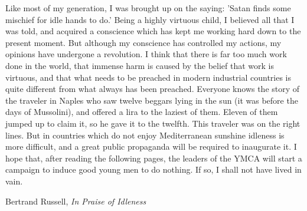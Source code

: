 \vspace*{2cm}
\epigraph{Like most of my generation, I was brought up on the saying: 'Satan finds some mischief for idle hands to do.' Being a highly virtuous child, I believed all that I was told, and acquired a conscience which has kept me working hard down to the present moment. But although my conscience has controlled my actions, my opinions have undergone a revolution. I think that there is far too much work done in the world, that immense harm is caused by the belief that work is virtuous, and that what needs to be preached in modern industrial countries is quite different from what always has been preached. Everyone knows the story of the traveler in Naples who saw twelve beggars lying in the sun (it was before the days of Mussolini), and offered a lira to the laziest of them. Eleven of them jumped up to claim it, so he gave it to the twelfth. This traveler was on the right lines. But in countries which do not enjoy Mediterranean sunshine idleness is more difficult, and a great public propaganda will be required to inaugurate it. I hope that, after reading the following pages, the leaders of the YMCA will start a campaign to induce good young men to do nothing. If so, I shall not have lived in vain.}{Bertrand Russell, \textit{In Praise of Idleness}}
\vfill
\pagebreak
